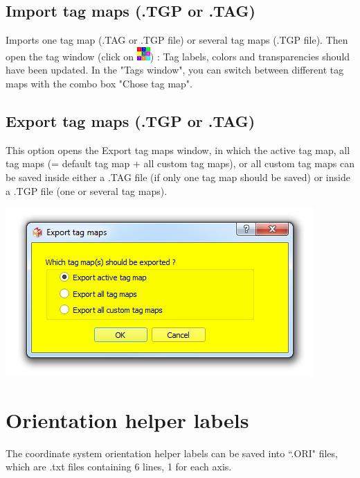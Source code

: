\noindent



\subsection{Import tag maps (.TGP or .TAG)}
Imports one tag map (.TAG or .TGP file) or several tag maps (.TGP file). Then open the tag window (click on \includegraphics[scale=0.7]{images/07/tagmaps/tagmaps.png}) : Tag labels, colors and transparencies should have been updated. In the "Tags window", you can switch between different tag maps with the combo box "Chose tag map".

\subsection{Export tag maps (.TGP or .TAG)}

\begin{minipage}{0.55\textwidth}
This option opens the Export tag maps window, in which the active tag map, all tag maps (= default tag map + all custom tag maps), or all custom tag maps can be saved inside either a .TAG file (if only one tag map should be saved) or inside a .TGP file (one or several tag maps).


\end{minipage}  
 \begin{minipage}{0.45\textwidth}\centering
  \includegraphics[scale=0.5]{images/07/tagmaps/export.png}
 \end{minipage} 

\section{Orientation helper labels}
The coordinate system orientation helper labels can be saved into ``.ORI" files, which are .txt files
containing 6 lines, 1 for each axis.



